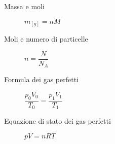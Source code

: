 \documentclass[a4paper,11pt,italian]{article}
\begin{document}
\begin{description}
  \item[Massa e moli]
  $ m_{[g]} = n M $
  
  \item[Moli e numero di particelle]
$ n = \dfrac{N}{N_A} $
  
%   
  
  \item[Formula dei gas perfetti]
$ \dfrac{p_0 V_0}{T_0} = \dfrac{p_1 V_1}{T_1} $
  
  \item[Equazione di stato dei gas perfetti]$ pV = nRT $
\end{description}
\end{document}
